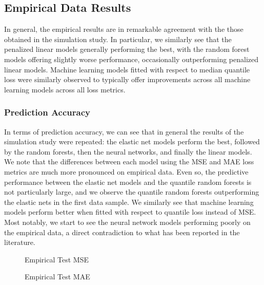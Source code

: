 \documentclass{article}
\begin{document}
\newpage

\subsection{Empirical Data Results}


In general, the empirical results are in remarkable agreement with the those obtained in the simulation study. In particular, we similarly see that the penalized linear models generally performing the best, with the random forest models offering slightly worse performance, occasionally outperforming penalized linear models. Machine learning models fitted with respect to median quantile loss were similarly observed to typically offer improvements across all machine learning models across all loss metrics. 

\subsubsection{Prediction Accuracy}

In terms of prediction accuracy, we can see that in general the results of the simulation study were repeated: the elastic net models perform the best, followed by the random forests, then the neural networks, and finally the linear models. We note that the differences between each model using the MSE and MAE loss metrics are much more pronounced on empirical data. Even so, the predictive performance between the elastic net models and the quantile random forests is not particularly large, and we observe the quantile random forests outperforming the elastic nets in the first data sample. We similarly see that machine learning models perform better when fitted with respect to quantile loss instead of MSE. Most notably, we start to see the neural network models performing poorly on the empirical data, a direct contradiction to what has been reported in the literature.

\begin{figure}[!htb]
	\centering
	\caption{Empirical Test MSE}
\end{figure}

\begin{figure}[!htb]
	\centering
	\caption{Empirical Test MAE}
\end{figure}
\end{document}
